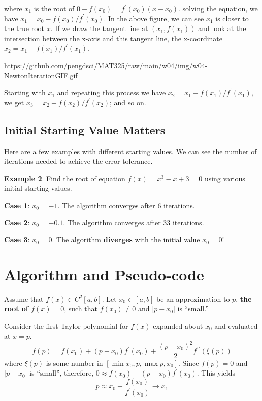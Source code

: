 \documentclass[
]{book}
\begin{document}
where \(x_1\) is the root of \(0-f(x_0)=f^\prime(x_0)(x-x_0)\). solving the equation, we have \(x_1= x_0 - f(x_0)/f^\prime(x_0)\). In the above figure, we can see \(x_1\) is closer to the true root \(x\). If we draw the tangent line at \((x_1, f(x_1))\) and look at the intersection between the x-axis and this tangent line, the x-coordinate \(x_2 = x_1 - f(x_1)/f^\prime(x_1)\).

\url{https://github.com/pengdsci/MAT325/raw/main/w04/img/w04-NewtonIterationGIF.gif}

Starting with \(x_1\) and repeating this process we have \(x_2 = x_1 - f(x_1)/f^\prime (x_1)\), we get \(x_3=x_2-f(x_2)/f^\prime(x_2)\); and so on.

\hfill\break

\hypertarget{initial-starting-value-matters}{%
\subsection{Initial Starting Value Matters}\label{initial-starting-value-matters}}

Here are a few examples with different starting values. We can see the number of iterations needed to achieve the error tolerance.

\textbf{Example 2}. Find the root of equation \(f(x) = x^3 - x + 3 = 0\) using various initial starting values.

\textbf{Case 1}: \(x_0 = -1\). The algorithm converges after 6 iterations.

\textbf{Case 2}: \(x_0 = -0.1\). The algorithm converges after 33 iterations.

\textbf{Case 3}: \(x_0 = 0\). The algorithm \textbf{diverges} with the initial value \(x_0 = 0\)!

\hfill\break

\hypertarget{algorithm-and-pseudo-code}{%
\section{Algorithm and Pseudo-code}\label{algorithm-and-pseudo-code}}

Assume that \(f(x)\in C^2[a,b]\). Let \(x_0 \in [a, b]\) be an approximation to \(p\), \textbf{the root of \(f(x) = 0\)}, such that \(f(x_0) \ne 0\) and \(|p-x_0|\) is ``small.''

Consider the first Taylor polynomial for \(f(x)\) expanded about \(x_0\) and evaluated at \(x = p\).
\[
f(p) = f(x_0) + (p - x_0)f^\prime(x_0) + \frac{(p - x_0)^2}{2}f^{\prime\prime}(\xi(p))
\]
where \(\xi(p)\) is some number in \([\min{x_0, p}, \max{p, x_0}]\). Since \(f(p) = 0\) and \(|p-x_0|\) is ``small'', therefore, \(0 \approx f(x_0) - (p - x_0)f^\prime(x_0)\). This yields
\[
p \approx x_0 -\frac{f(x_0)}{f^\prime(x_0)} \to x_1
\]
\end{document}
